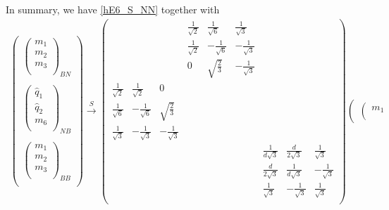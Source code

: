 In summary, we have \eqref{hE6_S_NN} together with 
\begin{align}
\left(\begin{matrix}
\left( \begin{matrix}
{m}_1\\
{m}_2\\
{m}_3\\
\end{matrix} \right)_{BN} \\
\\
\left( \begin{matrix}
\widehat{{q}}_1\\
\widehat{{q}}_2\\
{m}_6\\
\end{matrix} \right)_{NB}\\
\\
\left( \begin{matrix}
{m}_1\\
{m}_2\\
{m}_3\\
\end{matrix} \right)_{BB} \\
\end{matrix} \right)
\xrightarrow{S} \left( \begin{matrix}
&&&			\frac{1}{\sqrt{2}} & \frac{1}{\sqrt{6}} &  \frac{1}{\sqrt{3}} &			&&\\
&&&			\frac{1}{\sqrt{2}} & - \frac{1}{\sqrt{6}} & -\frac{1}{\sqrt{3}}& 			&&\\
&&&			0& \sqrt{\frac{2}{3}} & -\frac{1}{\sqrt{3}}& 			&&\\
\frac{1}{\sqrt{2}}& \frac{1}{\sqrt{2}}& 0&			&&& 			&&\\
\frac{1}{\sqrt{6}} & - \frac{1}{\sqrt{6}} & \sqrt{\frac{2}{3}}&			&&& 			&&\\
\frac{1}{\sqrt{3}} & - \frac{1}{\sqrt{3}} & - \frac{1}{\sqrt{3}}&			&&& 			&&\\
&&&			&&&			\frac{1}{d\sqrt{3}} & \frac{d}{2\sqrt{3}} & \frac{1}{\sqrt{3}}\\
&&&			&&& 			\frac{d}{2\sqrt{3}} & \frac{1}{d\sqrt{3}} & -\frac{1}{\sqrt{3}}\\
&&&			&&& 			\frac{1}{\sqrt{3}} & -\frac{1}{\sqrt{3}} & \frac{1}{\sqrt{3}}\\
\end{matrix} \right)
\left(\begin{matrix}
\left( \begin{matrix}
{m}_1\\

\end{matrix}
\end{matrix}
\end{align}

